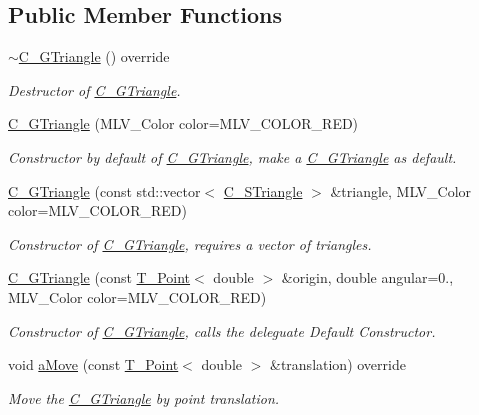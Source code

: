 \subsection*{Public Member Functions}
\begin{DoxyCompactItemize}
\item 
\hyperlink{classC__GTriangle_ad904f86d6bde64caabd005b3bad333e2}{$\sim$\+C\+\_\+\+G\+Triangle} () override
\begin{DoxyCompactList}\small\item\em Destructor of \hyperlink{classC__GTriangle}{C\+\_\+\+G\+Triangle}. \end{DoxyCompactList}\item 
\hyperlink{classC__GTriangle_aba5786a8cd754d526758e05df3f70a51}{C\+\_\+\+G\+Triangle} (M\+L\+V\+\_\+\+Color color=M\+L\+V\+\_\+\+C\+O\+L\+O\+R\+\_\+\+R\+ED)
\begin{DoxyCompactList}\small\item\em Constructor by default of \hyperlink{classC__GTriangle}{C\+\_\+\+G\+Triangle}, make a \hyperlink{classC__GTriangle}{C\+\_\+\+G\+Triangle} as default. \end{DoxyCompactList}\item 
\hyperlink{classC__GTriangle_a45212ea205ed1860ac57b048af9fd984}{C\+\_\+\+G\+Triangle} (const std\+::vector$<$ \hyperlink{classC__STriangle}{C\+\_\+\+S\+Triangle} $>$ \&triangle, M\+L\+V\+\_\+\+Color color=M\+L\+V\+\_\+\+C\+O\+L\+O\+R\+\_\+\+R\+ED)
\begin{DoxyCompactList}\small\item\em Constructor of \hyperlink{classC__GTriangle}{C\+\_\+\+G\+Triangle}, requires a vector of triangles. \end{DoxyCompactList}\item 
\hyperlink{classC__GTriangle_a2dc558251c2bd2591451e61f0d66714b}{C\+\_\+\+G\+Triangle} (const \hyperlink{classT__Point}{T\+\_\+\+Point}$<$ double $>$ \&origin, double angular=0., M\+L\+V\+\_\+\+Color color=M\+L\+V\+\_\+\+C\+O\+L\+O\+R\+\_\+\+R\+ED)
\begin{DoxyCompactList}\small\item\em Constructor of \hyperlink{classC__GTriangle}{C\+\_\+\+G\+Triangle}, calls the deleguate Default Constructor. \end{DoxyCompactList}\item 
void \hyperlink{classC__GTriangle_a07789441ce75f81fd4c4649a0115edbe}{a\+Move} (const \hyperlink{classT__Point}{T\+\_\+\+Point}$<$ double $>$ \&translation) override
\begin{DoxyCompactList}\small\item\em Move the \hyperlink{classC__GTriangle}{C\+\_\+\+G\+Triangle} by point translation. \end{DoxyCompactList}\item 

\end{DoxyCompactItemize}
